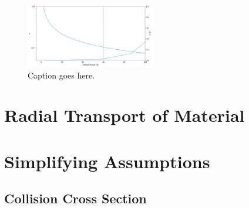 \documentclass[twocolumn]{aastex63}
\begin{document}
\begin{figure}
\begin{center}
    \includegraphics[width=0.5\textwidth]{figures/alpha_pl_frac.png}
    \caption{Caption goes here.\label{fig:alpha_pl_frac}}
\end{center}
\end{figure}




\section{Radial Transport of Material}


\section{Simplifying Assumptions}\label{sec:assump}

\subsection{Collision Cross Section}
\end{document}
